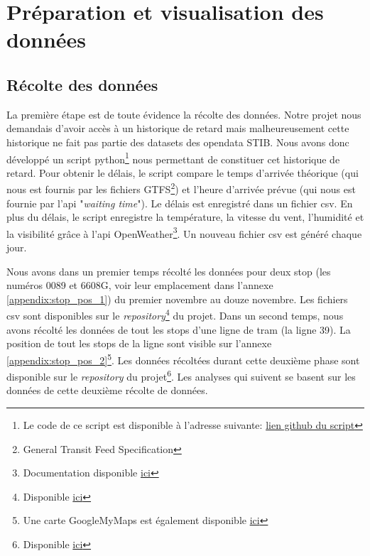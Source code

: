\chapter{Préparation et visualisation des données}

\section{Récolte des données}
La première étape est de toute évidence la récolte des données. Notre projet nous demandais d'avoir accès à un historique de retard mais malheureusement cette historique ne fait pas partie des datasets des opendata STIB. Nous avons donc développé un script python\footnote{Le code de ce script est disponible à l'adresse suivante: \href{https://github.com/jalbrecq/CanYouCatchIt/blob/main/sandbox/delay_gathering/delay_gathering.py}{lien github du script}} nous permettant de constituer cet historique de retard. Pour obtenir le délais, le script compare le temps d'arrivée théorique (qui nous est fournis par les fichiers GTFS\footnote{General Transit Feed Specification}) et l'heure d'arrivée prévue (qui nous est fournie par l'api "\textit{waiting time}"). Le délais est enregistré dans un fichier csv. En plus du délais, le script enregistre la température, la vitesse du vent, l'humidité et la visibilité grâce à l'api OpenWeather\footnote{Documentation disponible \href{https://openweathermap.org/}{ici}}. Un nouveau fichier csv est généré chaque jour.

Nous avons dans un premier temps récolté les données pour deux stop (les numéros 0089 et 6608G, voir leur emplacement dans l'annexe \ref{appendix:stop_pos_1}) du premier novembre au douze novembre. Les fichiers csv sont disponibles sur le \textit{repository}\footnote{Disponible \href{https://github.com/jalbrecq/CanYouCatchIt/tree/main/sandbox/data/csv}{ici}} du projet. Dans un second temps, nous avons récolté les données de tout les stops d'une ligne de tram (la ligne 39). La position de tout les stops de la ligne sont visible sur l'annexe \ref{appendix:stop_pos_2}\footnote{Une carte GoogleMyMaps est également disponible \href{https://www.google.com/maps/d/edit?mid=1_qNGPUfuZXrqC3UZXkmDOWuhEHJfYAox&usp=sharing}{ici}}. Les données récoltées durant cette deuxième phase sont disponible sur le \textit{repository} du projet\footnote{Disponible \href{https://github.com/jalbrecq/CanYouCatchIt/tree/main/sandbox/data/csv2}{ici}}. Les analyses qui suivent se basent sur les données de cette deuxième récolte de données.

